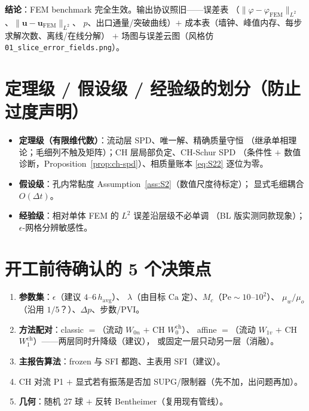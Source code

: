 \documentclass[11pt]{article}
\theoremstyle{definition}
\theoremstyle{plain}
\theoremstyle{remark}
\newcommand{\vel}{\bm{u}}
\newcommand{\code}[1]{\texttt{#1}}
\begin{document}
\noindent\textbf{结论}：FEM benchmark 完全生效。输出协议照旧——误差表
（$\|\varphi-\varphi_{\mathrm{FEM}}\|_{L^2}$、$\|\vel-\vel_{\mathrm{FEM}}\|_{L^2}$、
$p$、出口通量/突破曲线）$+$ 成本表（墙钟、峰值内存、每步求解次数、离线/在线分解）
$+$ 场图与误差云图（风格仿 \code{01\_slice\_error\_fields.png}）。

\section{定理级 / 假设级 / 经验级的划分（防止过度声明）}

\begin{itemize}
\item \textbf{定理级（有限维代数）}：流动层 SPD、唯一解、精确质量守恒
（继承单相理论；毛细列不触及矩阵）；CH 层局部负定、CH-Schur SPD
（条件性 $+$ 数值诊断，Proposition~\ref{prop:ch-spd}）、相质量账本 \eqref{eq:S22} 逐位为零。
\item \textbf{假设级}：孔内常黏度 Assumption~\ref{ass:S2}（数值尺度待标定）；
显式毛细耦合 $O(\Delta t)$。
\item \textbf{经验级}：相对单体 FEM 的 $L^2$ 误差沿层级不必单调
（BL 版实测同款现象）；$\epsilon$-网格分辨敏感性。
\end{itemize}

\section{开工前待确认的 5 个决策点}

\begin{enumerate}
\item \textbf{参数集}：$\epsilon$（建议 $4$--$6\,h_{\mathrm{avg}}$）、
$\lambda$（由目标 $\mathrm{Ca}$ 定）、$M_c$（$\mathrm{Pe}\sim10$--$10^2$）、
$\mu_w/\mu_o$（沿用 $1/5$？）、$\Delta p$、步数/PVI。
\item \textbf{方法配对}：classic $=$（流动 $W_{0n}$ $+$ CH $W^{\mathrm{ch}}_0$）、
affine $=$（流动 $W_{1v}$ $+$ CH $W^{\mathrm{ch}}_1$）——两层同时升降级（建议），
或固定一层只动另一层（消融）。
\item \textbf{主报告算法}：frozen 与 SFI 都跑、主表用 SFI（建议）。
\item CH 对流 P1 $+$ 显式若有振荡是否加 SUPG/限制器（先不加，出问题再加）。
\item \textbf{几何}：随机 27 球 $+$ 反转 Bentheimer（复用现有管线）。
\end{enumerate}
\end{document}
